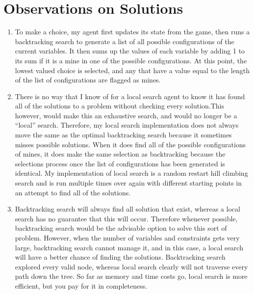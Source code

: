 \documentclass[11pt,letterpaper,notitlepage]{report}
\begin{document}
\section*{Observations on Solutions}
\begin{enumerate}
\item To make a choice, my agent first updates its state from the game, then runs a backtracking search to generate a list of all possible configurations of the current variables.  It then sums up the values of each variable by adding 1 to its sum if it is a mine in one of the possible configurations. At this point, the lowest valued choice is selected, and any that have a value equal to the length of the list of configurations are flagged as mines.
\item There is no way that I know of for a local search agent to know it has found all of the solutions to a problem without checking every solution.This however, would make this an exhaustive search, and would no longer be a ``local'' search.  Therefore, my local search implementation does not always move the same as the optimal backtracking search because it sometimes misses possible solutions.  When it does find all of the possible configurations of mines, it does make the same selection as backtracking because the selections process once the list of configurations has been generated is identical.  My implementation of local search is a random restart hill climbing search and is run multiple times over again with different starting points in an attempt to find all of the solutions.
\item Backtracking search will always find all solution that exist, whereas a local search has no guarantee that this will occur.  Therefore whenever possible, backtracking search would be the advisable option to solve this sort of problem.  However, when the number of variables and constraints gets very large, backtracking search cannot manage it, and in this case, a local search will have a better chance of finding the solutions. Backtracking search explored every valid node, whereas local search clearly will not traverse every path down the tree.  So far as memory and time costs go, local search is more efficient, but you pay for it in completeness.
\end{enumerate}
\end{document}
